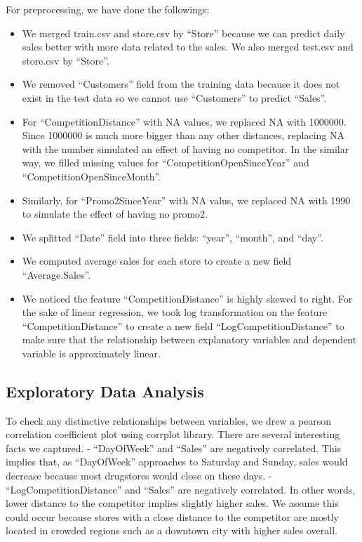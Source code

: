 \documentclass[letterpaper,twocolumn,10pt]{article}
\begin{document}
For preprocessing, we have done the followings:
\begin{itemize}
\item We merged train.csv and store.csv by ``Store'' because we can predict daily sales better with more data related to the sales. We also merged test.csv and store.csv by ``Store''.
\item We removed ``Customers'' field from the training data because it does not exist in the test data so we cannot use ``Customers'' to predict ``Sales''.
\item For ``CompetitionDistance'' with NA values, we replaced NA with 1000000. Since 1000000 is much more bigger than any other distances, replacing NA with the number simulated an effect of having no competitor. In the similar way, we filled missing values for ``CompetitionOpenSinceYear'' and ``CompetitionOpenSinceMonth''.
\item Similarly, for ``Promo2SinceYear'' with NA valus, we replaced NA with 1990 to simulate the effect of having no promo2.
\item We splitted ``Date'' field into three fields: ``year'', ``month'', and ``day''.
\item We computed average sales for each store to create a new field ``Average.Sales''.
\item We noticed the feature ``CompetitionDistance'' is highly skewed to right. For the sake of linear regression, we took log transformation on the feature ``CompetitionDistance'' to create a new field ``LogCompetitionDistance'' to make sure that the relationship between explanatory variables and dependent variable is approximately linear.
\end{itemize}


\subsection{Exploratory Data Analysis}
To check any distinctive relationships between variables, we drew a pearson correlation coefficient plot using corrplot library. There are several interesting facts we captured. 
- ``DayOfWeek'' and ``Sales'' are negatively correlated. This implies that, as ``DayOfWeek'' approaches to Saturday and Sunday, sales would decrease because most drugstores would close on these days. 
- ``LogCompetitionDistance'' and ``Sales'' are negatively correlated. In other words, lower distance to the competitor implies slightly higher sales. We assume this could occur because stores with a close distance to the competitor are mostly located in crowded regions such as a downtown city with higher sales overall.
\end{document}
